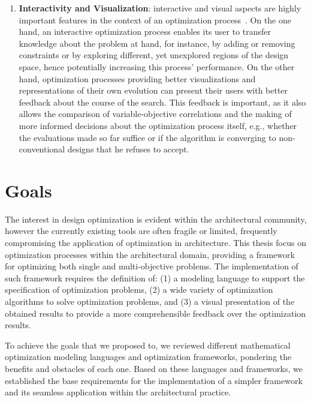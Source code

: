 \begin{enumerate}
\item \textbf{Interactivity and Visualization}: interactive and visual aspects are highly important features in the context of an optimization process~\cite{Ashour2015CreativelyMOO}. On the one hand, an interactive optimization process enables its user to transfer knowledge about the problem at hand, for instance, by adding or removing constraints or by exploring different, yet unexplored regions of the design space, hence potentially increasing this process' performance. On the other hand, optimization processes providing better visualizations and representations of their own evolution can present their users with better feedback about the course of the search. This feedback is important, as it also allows the comparison of variable-objective correlations and the making of more informed decisions about the optimization process itself, e.g., whether the evaluations made so far suffice or if the algorithm is converging to non-conventional designs that he refuses to accept.
\end{enumerate}


\section{Goals}
The interest in design optimization is evident within the architectural community, however the currently existing tools are often fragile or limited, frequently compromising the application of optimization in architecture. This thesis focus on optimization processes within the architectural domain, providing a framework for optimizing both single and multi-objective problems. The implementation of such framework requires the definition of: (1) a modeling language to support the specification of optimization problems, (2) a wide variety of optimization algorithms to solve optimization problems, and (3) a visual presentation of the obtained results to provide a more comprehensible feedback over the optimization results.

To achieve the goals that we proposed to, we reviewed different mathematical optimization modeling languages and optimization frameworks, pondering the benefits and obstacles of each one. Based on these languages and frameworks, we established the base requirements for the implementation of a simpler framework and its seamless application within the architectural practice. 

